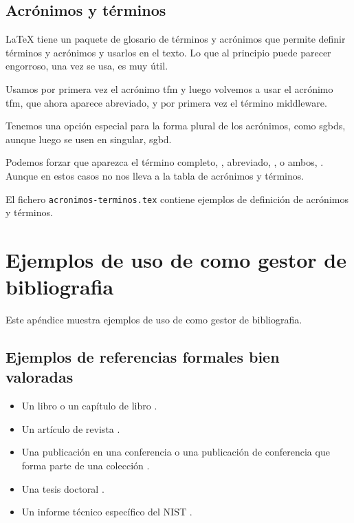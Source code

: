   
  \section{Acrónimos y términos}

  \LaTeX{} tiene un paquete de glosario de términos y acrónimos que permite definir términos y acrónimos y usarlos en el texto.
  Lo que al principio puede parecer engorroso, una vez se usa, es muy útil.
  
  Usamos por primera vez el acrónimo \gls{tfm} y luego volvemos a usar el acrónimo \gls{tfm}, que ahora aparece abreviado, y por primera vez el término \gls{middleware}.
  
  Tenemos una opción especial para la forma plural de los acrónimos, como \glspl{sgbd}, aunque luego se usen en singular, \gls{sgbd}.
  
  Podemos forzar que aparezca el término completo, , abreviado, , o ambos, .
  Aunque en estos casos no nos lleva a la tabla de acrónimos y términos.
  
  El fichero {\tt acronimos-terminos.tex} contiene ejemplos de definición de acrónimos y términos.

  \chapter{Ejemplos de uso de \BibTeX{} como gestor de bibliografia}

Este apéndice muestra ejemplos de uso de \BibTeX{} como gestor de bibliografia.

\section{Ejemplos de referencias formales bien valoradas}

\begin{itemize}
  \item Un libro \cite{libro} o un capítulo de libro \cite{capitulo}.
  \item Un artículo de revista \cite{articulo}.
  \item Una publicación en una conferencia \cite{conferencia} o una publicación de conferencia que forma parte de una colección \cite{coleccion}.
  \item Una tesis doctoral \cite{tesis}.
  \item Un informe técnico específico del NIST \cite{informe-especifico}.
\end{itemize}

